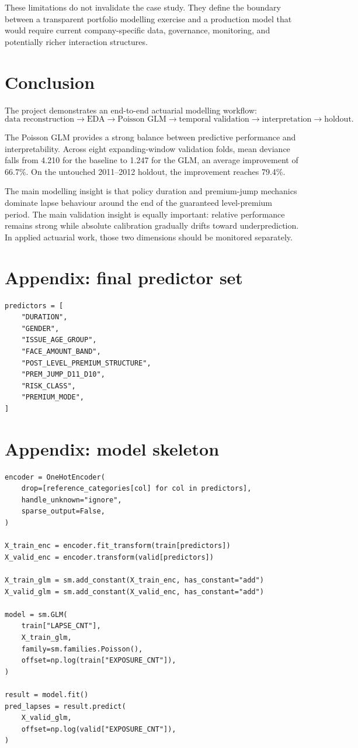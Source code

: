 \documentclass[11pt,a4paper]{article}
\theoremstyle{definition}
\begin{document}
These limitations do not invalidate the case study. They define the boundary between a transparent portfolio modelling exercise and a production model that would require current company-specific data, governance, monitoring, and potentially richer interaction structures.

\section{Conclusion}
The project demonstrates an end-to-end actuarial modelling workflow:
\[
\text{data reconstruction} \to \text{EDA} \to \text{Poisson GLM} \to \text{temporal validation} \to \text{interpretation} \to \text{holdout}.
\]

The Poisson GLM provides a strong balance between predictive performance and interpretability. Across eight expanding-window validation folds, mean deviance falls from 4.210 for the baseline to 1.247 for the GLM, an average improvement of 66.7\%. On the untouched 2011--2012 holdout, the improvement reaches 79.4\%.

The main modelling insight is that policy duration and premium-jump mechanics dominate lapse behaviour around the end of the guaranteed level-premium period. The main validation insight is equally important: relative performance remains strong while absolute calibration gradually drifts toward underprediction. In applied actuarial work, those two dimensions should be monitored separately.

\newpage
\appendix
\section{Appendix: final predictor set}
\begin{lstlisting}[style=py,caption={Final categorical predictor set}]
predictors = [
    "DURATION",
    "GENDER",
    "ISSUE_AGE_GROUP",
    "FACE_AMOUNT_BAND",
    "POST_LEVEL_PREMIUM_STRUCTURE",
    "PREM_JUMP_D11_D10",
    "RISK_CLASS",
    "PREMIUM_MODE",
]
\end{lstlisting}

\section{Appendix: model skeleton}
\begin{lstlisting}[style=py,caption={Poisson GLM with policy-count exposure offset}]
encoder = OneHotEncoder(
    drop=[reference_categories[col] for col in predictors],
    handle_unknown="ignore",
    sparse_output=False,
)

X_train_enc = encoder.fit_transform(train[predictors])
X_valid_enc = encoder.transform(valid[predictors])

X_train_glm = sm.add_constant(X_train_enc, has_constant="add")
X_valid_glm = sm.add_constant(X_valid_enc, has_constant="add")

model = sm.GLM(
    train["LAPSE_CNT"],
    X_train_glm,
    family=sm.families.Poisson(),
    offset=np.log(train["EXPOSURE_CNT"]),
)

result = model.fit()
pred_lapses = result.predict(
    X_valid_glm,
    offset=np.log(valid["EXPOSURE_CNT"]),
)
\end{lstlisting}
\end{document}
